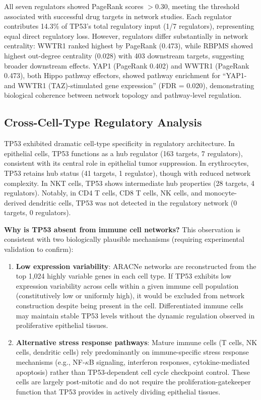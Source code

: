 \documentclass[11pt]{article}
\begin{document}
All seven regulators showed PageRank scores $>$0.30, meeting the threshold associated with successful drug targets in network studies. Each regulator contributes 14.3\% of TP53's total regulatory input (1/7 regulators), representing equal direct regulatory loss. However, regulators differ substantially in network centrality: WWTR1 ranked highest by PageRank (0.473), while RBPMS showed highest out-degree centrality (0.028) with 403 downstream targets, suggesting broader downstream effects. YAP1 (PageRank 0.402) and WWTR1 (PageRank 0.473), both Hippo pathway effectors, showed pathway enrichment for ``YAP1- and WWTR1 (TAZ)-stimulated gene expression'' (FDR = 0.020), demonstrating biological coherence between network topology and pathway-level regulation.

\subsection{Cross-Cell-Type Regulatory Analysis}

TP53 exhibited dramatic cell-type specificity in regulatory architecture. In epithelial cells, TP53 functions as a hub regulator (163 targets, 7 regulators), consistent with its central role in epithelial tumor suppression. In erythrocytes, TP53 retains hub status (41 targets, 1 regulator), though with reduced network complexity. In NKT cells, TP53 shows intermediate hub properties (28 targets, 4 regulators). Notably, in CD4 T cells, CD8 T cells, NK cells, and monocyte-derived dendritic cells, TP53 was not detected in the regulatory network (0 targets, 0 regulators).

\textbf{Why is TP53 absent from immune cell networks?} This observation is consistent with two biologically plausible mechanisms (requiring experimental validation to confirm):

\begin{enumerate}
\item \textbf{Low expression variability}: ARACNe networks are reconstructed from the top 1,024 highly variable genes in each cell type. If TP53 exhibits low expression variability across cells within a given immune cell population (constitutively low or uniformly high), it would be excluded from network construction despite being present in the cell. Differentiated immune cells may maintain stable TP53 levels without the dynamic regulation observed in proliferative epithelial tissues.

\item \textbf{Alternative stress response pathways}: Mature immune cells (T cells, NK cells, dendritic cells) rely predominantly on immune-specific stress response mechanisms (e.g., NF-$\kappa$B signaling, interferon responses, cytokine-mediated apoptosis) rather than TP53-dependent cell cycle checkpoint control. These cells are largely post-mitotic and do not require the proliferation-gatekeeper function that TP53 provides in actively dividing epithelial tissues.
\end{enumerate}
\end{document}
